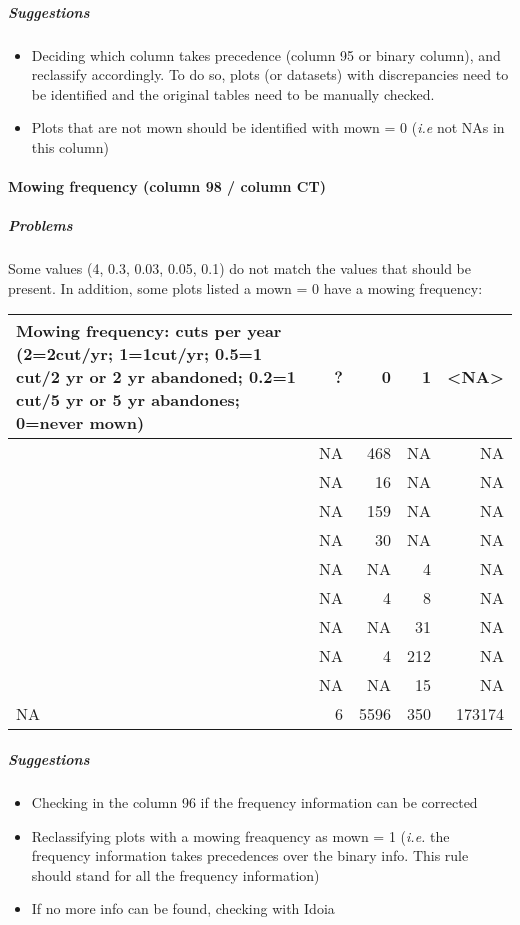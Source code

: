 \documentclass[table]{article}
\providecommand{\tightlist}{%
  \setlength{\itemsep}{0pt}\setlength{\parskip}{0pt}}
\let\oldparagraph\paragraph
\renewcommand{\paragraph}[1]{\oldparagraph{#1}\mbox{}}
\let\oldsubparagraph\subparagraph
\renewcommand{\subparagraph}[1]{\oldsubparagraph{#1}\mbox{}}
\begin{document}
\subparagraph{\texorpdfstring{\emph{Suggestions}}{Suggestions}}\label{suggestions-2}

\begin{itemize}
\tightlist
\item
  Deciding which column takes precedence (column 95 or binary column),
  and reclassify accordingly. To do so, plots (or datasets) with
  discrepancies need to be identified and the original tables need to be
  manually checked.
\item
  Plots that are not mown should be identified with mown = 0 (\emph{i.e}
  not NAs in this column)
\end{itemize}

\paragraph{Mowing frequency (column 98 / column
CT)}\label{mowing-frequency-column-98-column-ct}

\subparagraph{\texorpdfstring{\emph{Problems}}{Problems}}\label{problems-3}

Some values (4, 0.3, 0.03, 0.05, 0.1) do not match the values that
should be present. In addition, some plots listed a mown = 0 have a
mowing frequency:

\begin{tabular}{>{\raggedright\arraybackslash}p{8cm}|r|r|r|r}
\hline
Mowing frequency: cuts per year (2=2cut/yr; 1=1cut/yr; 0.5=1 cut/2 yr or 2 yr abandoned; 0.2=1 cut/5 yr or 5 yr abandones; 0=never mown) & ? & 0 & 1 & <NA>\\
\hline
0 & NA & 468 & NA & NA\\
\hline
0.03 & NA & 16 & NA & NA\\
\hline
0.05 & NA & 159 & NA & NA\\
\hline
0.1 & NA & 30 & NA & NA\\
\hline
0.2 & NA & NA & 4 & NA\\
\hline
0.3 & NA & 4 & 8 & NA\\
\hline
0.5 & NA & NA & 31 & NA\\
\hline
1 & NA & 4 & 212 & NA\\
\hline
4 & NA & NA & 15 & NA\\
\hline
NA & 6 & 5596 & 350 & 173174\\
\hline
\end{tabular}

\subparagraph{\texorpdfstring{\emph{Suggestions}}{Suggestions}}\label{suggestions-3}

\begin{itemize}
\tightlist
\item
  Checking in the column 96 if the frequency information can be
  corrected
\item
  Reclassifying plots with a mowing freaquency as mown = 1 (\emph{i.e.}
  the frequency information takes precedences over the binary info. This
  rule should stand for all the frequency information)
\item
  If no more info can be found, checking with Idoia
\end{itemize}
\end{document}
